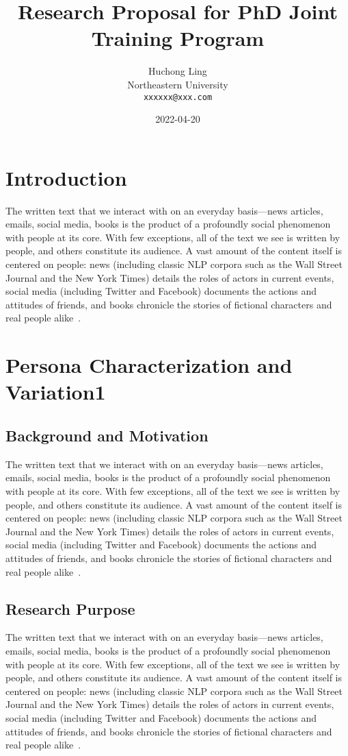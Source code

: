 \documentclass[11pt]{article}
\renewcommand\cite{\citep}  %
\begin{document}
\title{Research Proposal for PhD Joint Training Program}
\author{Huchong Ling \\
  Northeastern University \\
  {\tt xxxxxx@xxx.com} \\}
\date{2022-04-20}
\maketitle
{}
\tableofcontents
\newpage
{}
\section{Introduction}
The written text that we interact with on an everyday basis—news articles, emails, social media, books is the product of a profoundly social phenomenon with people at its core. With few exceptions, all of the text we see is written by people, and others constitute its audience. A vast amount of the content itself is centered on people: news (including classic NLP corpora such as the Wall Street Journal and the New York Times) details the roles of actors in current events, social media (including Twitter and Facebook) documents
the actions and attitudes of friends, and books chronicle the stories of fictional characters and real people alike~\cite{serban2016building}.

\section{Persona Characterization and Variation1}
\subsection{Background and Motivation}
The written text that we interact with on an everyday basis—news articles, emails, social media, books is the product of a profoundly social phenomenon with people at its core. With few exceptions, all of the text we see is written by people, and others constitute its audience. A vast amount of the content itself is centered on people: news (including classic NLP corpora such as the Wall Street Journal and the New York Times) details the roles of actors in current events, social media (including Twitter and Facebook) documents
the actions and attitudes of friends, and books chronicle the stories of fictional characters and real people alike~\cite{serban2016building}.
\subsection{Research Purpose}
The written text that we interact with on an everyday basis—news articles, emails, social media, books is the product of a profoundly social phenomenon with people at its core. With few exceptions, all of the text we see is written by people, and others constitute its audience. A vast amount of the content itself is centered on people: news (including classic NLP corpora such as the Wall Street Journal and the New York Times) details the roles of actors in current events, social media (including Twitter and Facebook) documents
the actions and attitudes of friends, and books chronicle the stories of fictional characters and real people alike~\cite{serban2016building}.
\end{document}
